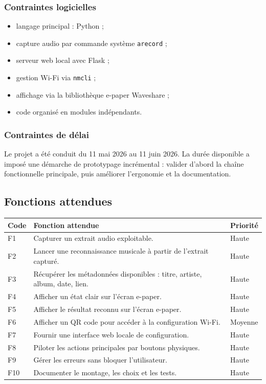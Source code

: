 \subsubsection{Contraintes logicielles}

\begin{itemize}
    \item langage principal : Python ;
    \item capture audio par commande système \texttt{arecord} ;
    \item serveur web local avec Flask ;
    \item gestion Wi-Fi via \texttt{nmcli} ;
    \item affichage via la bibliothèque e-paper Waveshare ;
    \item code organisé en modules indépendants.
\end{itemize}

\subsubsection{Contraintes de délai}

Le projet a été conduit du 11 mai 2026 au 11 juin 2026. La durée disponible a
imposé une démarche de prototypage incrémental : valider d'abord la chaîne
fonctionnelle principale, puis améliorer l'ergonomie et la documentation.

\subsection{Fonctions attendues}

\begin{longtable}{|p{1.5cm}|p{8.8cm}|p{2.2cm}|}
\hline
\textbf{Code} & \textbf{Fonction attendue} & \textbf{Priorité} \\
\hline
F1 & Capturer un extrait audio exploitable. & Haute \\
\hline
F2 & Lancer une reconnaissance musicale à partir de l'extrait capturé. & Haute \\
\hline
F3 & Récupérer les métadonnées disponibles : titre, artiste, album, date, lien. & Haute \\
\hline
F4 & Afficher un état clair sur l'écran e-paper. & Haute \\
\hline
F5 & Afficher le résultat reconnu sur l'écran e-paper. & Haute \\
\hline
F6 & Afficher un QR code pour accéder à la configuration Wi-Fi. & Moyenne \\
\hline
F7 & Fournir une interface web locale de configuration. & Haute \\
\hline
F8 & Piloter les actions principales par boutons physiques. & Haute \\
\hline
F9 & Gérer les erreurs sans bloquer l'utilisateur. & Haute \\
\hline
F10 & Documenter le montage, les choix et les tests. & Haute \\
\hline
\end{longtable}

